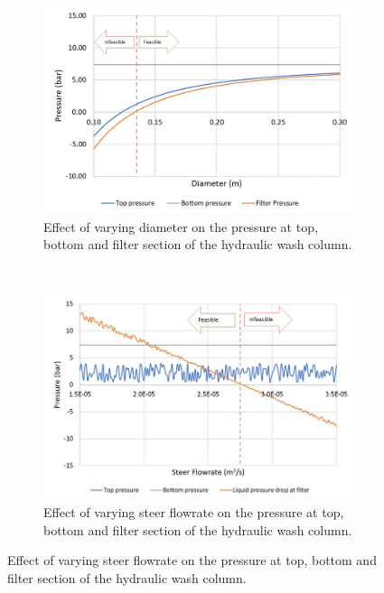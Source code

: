 \begin{figure}[h]
    \centering
    \begin{subfigure}[t]{0.5\textwidth}
        \centering
        \includegraphics[width=\linewidth]{chapters/3-separation/figures/diameter.jpg}
        \caption{Effect of varying diameter on the pressure at top, bottom and filter section of the hydraulic wash column.} 
        \label{fig:dia_col}
        \end{subfigure}%
    ~ 
    \begin{subfigure}[t]{0.5\textwidth}
        \centering
        \includegraphics[width=\linewidth]{chapters/3-separation/figures/steerflow.jpg}
        \caption{Effect of varying steer flowrate on the pressure at top, bottom and filter section of the hydraulic wash column.}
    \label{fig:steer}   
    \end{subfigure}

\end{figure}

